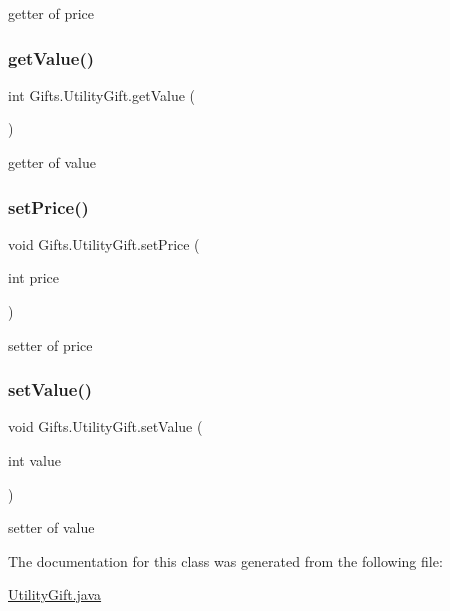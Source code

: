 getter of price \mbox{\label{class_gifts_1_1_utility_gift_a091e992419539418ca38c5711af14761}} 
\subsubsection{\texorpdfstring{get\+Value()}{getValue()}}
{\footnotesize\ttfamily int Gifts.\+Utility\+Gift.\+get\+Value (\begin{DoxyParamCaption}{ }\end{DoxyParamCaption})\hspace{0.3cm}{\ttfamily [inline]}}

getter of value \mbox{\label{class_gifts_1_1_utility_gift_a3b0702bb2129872af84e158051bcde83}} 
\subsubsection{\texorpdfstring{set\+Price()}{setPrice()}}
{\footnotesize\ttfamily void Gifts.\+Utility\+Gift.\+set\+Price (\begin{DoxyParamCaption}\item[{int}]{price }\end{DoxyParamCaption})\hspace{0.3cm}{\ttfamily [inline]}}

setter of price \mbox{\label{class_gifts_1_1_utility_gift_a40dfc7d666513e9953a2aa5af664565b}} 
\subsubsection{\texorpdfstring{set\+Value()}{setValue()}}
{\footnotesize\ttfamily void Gifts.\+Utility\+Gift.\+set\+Value (\begin{DoxyParamCaption}\item[{int}]{value }\end{DoxyParamCaption})\hspace{0.3cm}{\ttfamily [inline]}}

setter of value 

The documentation for this class was generated from the following file\+:\begin{DoxyCompactItemize}
\item 
\hyperlink{_utility_gift_8java}{Utility\+Gift.\+java}\end{DoxyCompactItemize}
